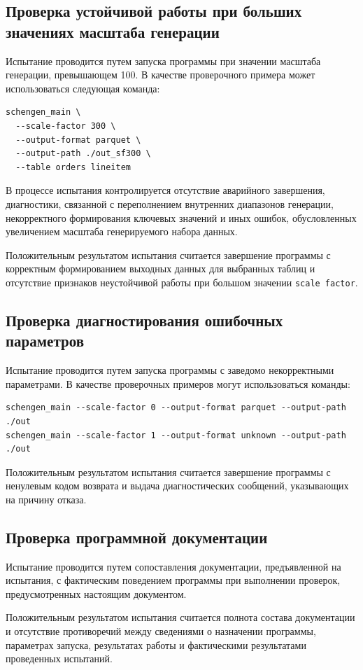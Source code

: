 \subsection{Проверка устойчивой работы при больших значениях масштаба генерации}

Испытание проводится путем запуска программы при значении масштаба генерации,
превышающем 100. В качестве проверочного примера может использоваться
следующая команда:
\begin{verbatim}
schengen_main \
  --scale-factor 300 \
  --output-format parquet \
  --output-path ./out_sf300 \
  --table orders lineitem
\end{verbatim}

В процессе испытания контролируется отсутствие аварийного завершения,
диагностики, связанной с переполнением внутренних диапазонов генерации,
некорректного формирования ключевых значений и иных ошибок, обусловленных
увеличением масштаба генерируемого набора данных.

Положительным результатом испытания считается завершение программы с корректным
формированием выходных данных для выбранных таблиц и отсутствие признаков
неустойчивой работы при большом значении \texttt{scale factor}.

\subsection{Проверка диагностирования ошибочных параметров}

Испытание проводится путем запуска программы с заведомо некорректными
параметрами. В качестве проверочных примеров могут использоваться команды:
\begin{verbatim}
schengen_main --scale-factor 0 --output-format parquet --output-path ./out
schengen_main --scale-factor 1 --output-format unknown --output-path ./out
\end{verbatim}

Положительным результатом испытания считается завершение программы с ненулевым
кодом возврата и выдача диагностических сообщений, указывающих на причину
отказа.

\subsection{Проверка программной документации}

Испытание проводится путем сопоставления документации, предъявленной на
испытания, с фактическим поведением программы при выполнении проверок,
предусмотренных настоящим документом.

Положительным результатом испытания считается полнота состава документации и
отсутствие противоречий между сведениями о назначении программы, параметрах
запуска, результатах работы и фактическими результатами проведенных испытаний.
